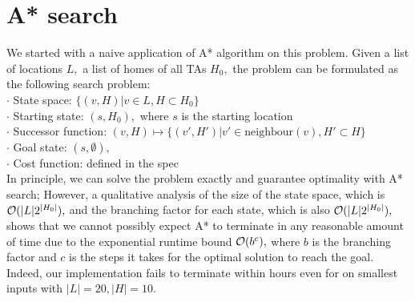 \documentclass{article}
\begin{document}
\section{A* search}
We started with a naive application of A* algorithm on this problem. Given a list of locations $L,$ a list of homes of all TAs $H_0,$  the problem can be formulated as the following search problem:\\
\indent$\cdot$ State space: $\{(v, H)| v \in L, H \subset H_0\}$ \\
\indent$\cdot$ Starting state: $(s, H_0),$ where $s$ is the starting location\\
\indent$\cdot$ Successor function: $(v, H) \mapsto \{(v', H')| v' \in \text{neighbour}(v), H' \subset H \}$\\
\indent$\cdot$ Goal state: $(s, \emptyset),$\\
\indent$\cdot$ Cost function: defined in the spec\\
In principle, we can solve the problem exactly and guarantee optimality with A* search; However, a qualitative analysis of the size of the state space, which is $\order*{|L|2^{|H_0|}},$ and the branching factor for each state, which is also $\order*{|L|2^{|H_0|}},$ shows that we cannot possibly expect A* to terminate in any reasonable amount of time due to the exponential runtime bound $\order*{b^c},$ where $b$ is the branching factor and $c$ is the steps it takes for the optimal solution to reach the goal. Indeed, our implementation fails to terminate within hours even for on smallest inputs with $|L| = 20, |H| = 10.$  
\end{document}
